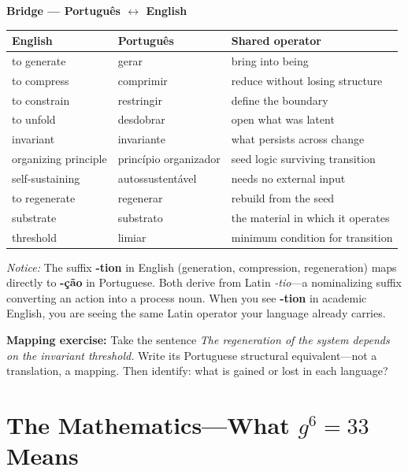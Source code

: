 \documentclass[11pt, twoside, openright]{book}
\theoremstyle{plain}
\theoremstyle{definition}
\newenvironment{bridgebox}{%
  \begin{mdframed}[backgroundcolor=BridgeBox,linecolor=green!50!black,linewidth=0.5pt,innertopmargin=6pt,innerbottommargin=6pt]
  \noindent\textbf{Bridge --- Portugu\^{e}s $\leftrightarrow$ English}\par\medskip}{\end{mdframed}}
\begin{document}
\begin{bridgebox}
\begin{tabularx}{\textwidth}{@{}LLL@{}}
\toprule
\textbf{English} & \textbf{Portugu\^{e}s} & \textbf{Shared operator} \\
\midrule
to generate     & gerar              & bring into being \\
to compress     & comprimir          & reduce without losing structure \\
to constrain    & restringir         & define the boundary \\
to unfold       & desdobrar          & open what was latent \\
invariant       & invariante         & what persists across change \\
organizing principle & princípio organizador & seed logic surviving transition \\
self-sustaining & autossustentável   & needs no external input \\
to regenerate   & regenerar          & rebuild from the seed \\
substrate       & substrato          & the material in which it operates \\
threshold       & limiar             & minimum condition for transition \\
\bottomrule
\end{tabularx}

\medskip
\textit{Notice:} The suffix \textbf{-tion} in English (generation, compression,
regeneration) maps directly to \textbf{-ção} in Portuguese. Both derive
from Latin \textit{-tio}---a nominalizing suffix converting an action into
a process noun. When you see \textbf{-tion} in academic English, you are
seeing the same Latin operator your language already carries.

\medskip
\textbf{Mapping exercise:} Take the sentence \textit{The regeneration of the system
depends on the invariant threshold.} Write its Portuguese structural
equivalent---not a translation, a mapping. Then identify: what is gained
or lost in each language?
\end{bridgebox}

\section{The Mathematics---What $g^6 = 33$ Means}
\end{document}
